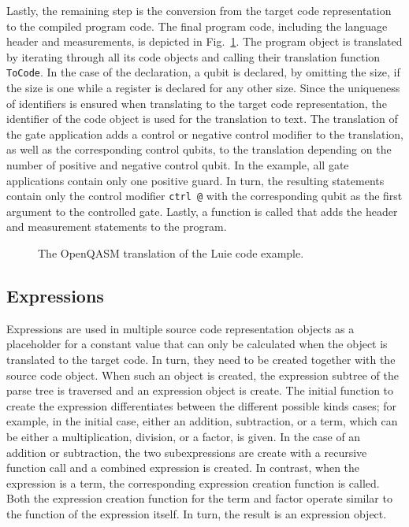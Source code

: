 Lastly, the remaining step is the conversion from the target code representation to the compiled program code. The final program code, including the language header and measurements, is depicted in Fig.~\ref{fig:codeGen_target_example}. The program object is translated by iterating through all its code objects and calling their translation function \texttt{ToCode}. In the case of the declaration, a qubit is declared, by omitting the size, if the size is one while a register is declared for any other size. Since the uniqueness of identifiers is ensured when translating to the target code representation, the identifier of the code object is used for the translation to text. The translation of the gate application adds a control or negative control modifier to the translation, as well as the corresponding control qubits, to the translation depending on the number of positive and negative control qubit. In the example, all gate applications contain only one positive guard. In turn, the resulting statements contain only the control modifier \texttt{ctrl @} with the corresponding qubit as the first argument to the controlled gate. Lastly, a function is called that adds the header and measurement statements to the program.  

\begin{figure}
    \centering
    
    \caption{The OpenQASM translation of the Luie code example.}
    \label{fig:codeGen_target_example}
\end{figure}


\subsection{Expressions}
\label{sec:implementation_expression}
Expressions are used in multiple source code representation objects as a placeholder for a constant value that can only be calculated when the object is translated to the target code. In turn, they need to be created together with the source code object. When such an object is created, the expression subtree of the parse tree is traversed and an expression object is create. The initial function to create the expression differentiates between the different possible kinds cases; for example, in the initial case, either an addition, subtraction, or a term, which can be either a multiplication, division, or a factor, is given. In the case of an addition or subtraction, the two subexpressions are create with a recursive function call and a combined expression is created. In contrast, when the expression is a term, the corresponding expression creation function is called. Both the expression creation function for the term and factor operate similar to the function of the expression itself. In turn, the result is an expression object. 

